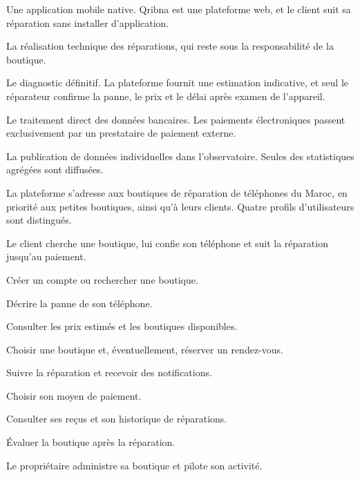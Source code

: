 \begin{cdcitems}
  \item Une application mobile native. Qribna est une plateforme web, et le client suit sa réparation sans installer d’application.
  \item La réalisation technique des réparations, qui reste sous la responsabilité de la boutique.
  \item Le diagnostic définitif. La plateforme fournit une estimation indicative, et seul le réparateur confirme la panne, le prix et le délai après examen de l’appareil.
  \item Le traitement direct des données bancaires. Les paiements électroniques passent exclusivement par un prestataire de paiement externe.
  \item La publication de données individuelles dans l’observatoire. Seules des statistiques agrégées sont diffusées.
\end{cdcitems}


La plateforme s’adresse aux boutiques de réparation de téléphones du Maroc, en priorité aux petites boutiques, ainsi qu’à leurs clients. Quatre profils d’utilisateurs sont distingués.


Le client cherche une boutique, lui confie son téléphone et suit la réparation jusqu’au paiement.

\begin{cdcitems}
  \item Créer un compte ou rechercher une boutique.
  \item Décrire la panne de son téléphone.
  \item Consulter les prix estimés et les boutiques disponibles.
  \item Choisir une boutique et, éventuellement, réserver un rendez-vous.
  \item Suivre la réparation et recevoir des notifications.
  \item Choisir son moyen de paiement.
  \item Consulter ses reçus et son historique de réparations.
  \item Évaluer la boutique après la réparation.
\end{cdcitems}


Le propriétaire administre sa boutique et pilote son activité.

